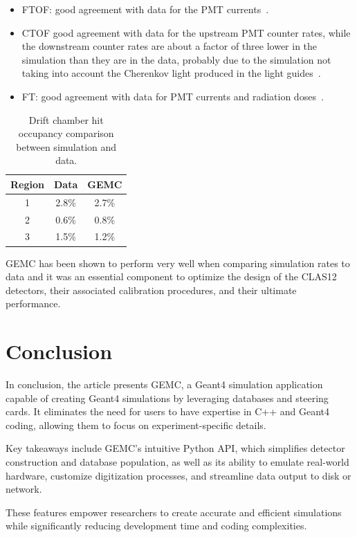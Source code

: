 \begin{itemize}
    \item FTOF: good agreement with data for the PMT currents~\cite{ftof-nim}.
    \item CTOF good agreement with data for the upstream PMT counter rates, while the downstream counter rates
    are about a factor of three lower in the simulation than they are in the data, probably due to the simulation
    not taking into account the Cherenkov light produced in the light guides~\cite{ctof-nim}.
    \item FT: good agreement with data for PMT currents and radiation doses~\cite{ft-nim}.
\end{itemize}

\begin{table}[h]
    \begin{center}
        \begin{tabular}{| c | c | c |}
            \hline \hline
            Region & Data  & GEMC  \\
            \hline
            1      & 2.8\% & 2.7\% \\
            2      & 0.6\% & 0.8\% \\
            3      & 1.5\% & 1.2\% \\
            \hline \hline
        \end{tabular}
    \end{center}
    \caption{Drift chamber hit occupancy comparison between simulation and data.}
    \label{tab:rates}
\end{table}

GEMC has been shown to perform very well when comparing simulation rates to
data and it was an essential component to optimize the design of the CLAS12 detectors,
their associated calibration procedures, and their ultimate performance.


\section{Conclusion}
\label{sec:conclusion}

In conclusion, the article presents GEMC, a Geant4 simulation application
capable of creating Geant4 simulations by leveraging databases and steering cards.
It eliminates the need for users to have expertise in C++ and Geant4 coding,
allowing them to focus on experiment-specific details.

Key takeaways include GEMC's intuitive Python API, which simplifies detector
construction and database population, as well as its ability to emulate real-world
hardware, customize digitization processes, and streamline data output to disk or network.

These features empower researchers to create accurate and efficient simulations while significantly
reducing development time and coding complexities.